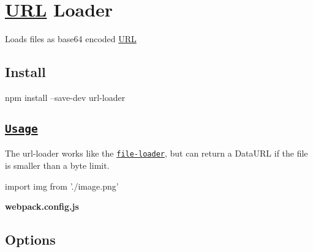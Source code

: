 \href{https://npmjs.com/package/url-loader}{\tt } \href{https://nodejs.org}{\tt } \href{https://david-dm.org/webpack-contrib/url-loader}{\tt } \href{https://travis-ci.org/webpack-contrib/url-loader}{\tt } \href{https://coveralls.io/github/webpack-contrib/url-loader}{\tt } \href{https://gitter.im/webpack/webpack}{\tt }

 \href{https://github.com/webpack/webpack}{\tt } \section*{\mbox{\hyperlink{namespace_u_r_l}{U\+RL}} Loader}

 

Loads files as {\ttfamily base64} encoded \mbox{\hyperlink{namespace_u_r_l}{U\+RL}}

 

\subsection*{Install}


\begin{DoxyCode}
npm install --save-dev url-loader
\end{DoxyCode}


\subsection*{\href{https://webpack.js.org/concepts/loaders}{\tt Usage}}

The {\ttfamily url-\/loader} works like the \href{https://github.com/webpack-contrib/file-loader}{\tt {\ttfamily file-\/loader}}, but can return a Data\+U\+RL if the file is smaller than a byte limit.


\begin{DoxyCode}
import img from './image.png'
\end{DoxyCode}


{\bfseries webpack.\+config.\+js} 


\subsection*{Options}

